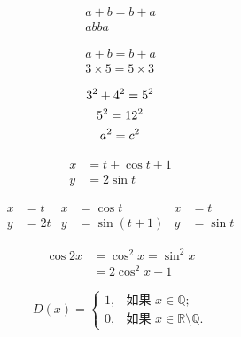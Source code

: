 \documentclass{ctexart}
\begin{document}
    \begin{gather}
        a + b = b+a \\
        ab ba
    \end{gather}

    \begin{gather*}
        a + b = b+a \\
        3 \times 5 = 5 \times 3
    \end{gather*}

    \begin{gather}
        3^2 + 4^2 = 5^2     \notag  \\
        5^2 = 12^2           \notag  \\
        a^2 =c ^2
    \end{gather}

    \begin{align}
        x &= t + \cos t + 1 \\
        y &= 2 \sin t
    \end{align}

    \begin{align*}
        x &= t & x &= \cos t & x &= t \\
        y &= 2t & y &= \sin(t+1) & y &= \sin t
    \end{align*}

    \begin{equation}
        \begin{split}
            \cos 2x & = \cos^2 x = \sin^2 x \\
            &= 2\cos^2x -1
        \end{split}
    \end{equation}

    \begin{equation}
        D(x) = \begin{cases}
            1,&\text{如果 } x \in  \mathbb{Q};   \\
            0,& \text{如果 } x \in  \mathbb{R} \setminus\mathbb{Q}.
        \end{cases}
    \end{equation}
\end{document}
